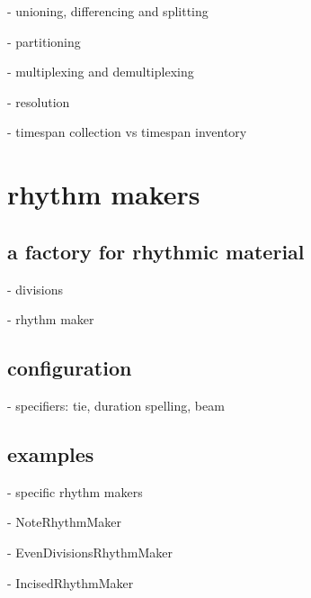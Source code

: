 - unioning, differencing and splitting

- partitioning

- multiplexing and demultiplexing

- resolution

- timespan collection vs timespan inventory

\section{rhythm makers}

\subsection{a factory for rhythmic material}

- divisions

\begin{comment}
<abjad>
divisions = [(3, 8), (4, 8), (3, 16), (4, 16), (5, 8), (2, 4)]
</abjad>
\end{comment}

- rhythm maker

\subsection{configuration}

- specifiers: tie, duration spelling, beam

\subsection{examples}

- specific rhythm makers

- NoteRhythmMaker

\begin{comment}
<abjad>
note_rhythm_maker = rhythmmakertools.NoteRhythmMaker(
    )
show(note_rhythm_maker, divisions=divisions)
</abjad>
\end{comment}

- EvenDivisionsRhythmMaker

\begin{comment}
<abjad>
even_division_rhythm_maker = rhythmmakertools.EvenDivisionRhythmMaker(
    denominators=[8, 16, 4],
    )
show(even_division_rhythm_maker, divisions=divisions)
</abjad>
\end{comment}

- IncisedRhythmMaker

\begin{comment}
<abjad>
incised_rhythm_maker = rhythmmakertools.IncisedRhythmMaker(
    incise_specifier=rhythmmakertools.InciseSpecifier(
        prefix_counts=[0],
        suffix_talea=[-1],
        suffix_counts=[1],
        talea_denominator=16,
        ),
    )
show(incised_rhythm_maker, divisions=divisions)
</abjad>
\end{comment}

